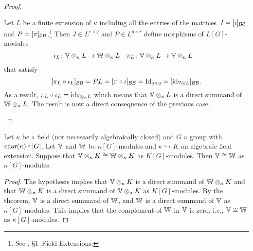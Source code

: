 \begin{proof}
\begin{description}
        Let $L$ be a finite extension of $\kappa$ including all the entries of the matrices $J=[\iota]_{\mathcal B\mathcal C}$ and $P=[\pi]_{\mathcal C\mathcal B}$.\footnote{See \citep{LC}, \S1~Field Extensions.} Then  $J\in L^{r\times q}$ and $P\in L^{q\times r}$ define morphisms of $L[G]$-modules
        \begin{align*}
            \iota_L\colon\mathbb V\otimes_\kappa L
                &\to\mathbb W\otimes_\kappa L
            &\pi_L\colon\mathbb V\otimes_\kappa L
                &\to\mathbb V\otimes_\kappa L
        \end{align*}
        that satisfy
        $$
            [\pi_L\circ\iota_L]_{\mathcal B\mathcal B}
                = PL = [\pi\circ\iota]_{\mathcal B\mathcal B}=\operatorname{Id}_{q\times q}
                =[\operatorname{id}_{\mathbb V\otimes L}]_{\mathcal B\mathcal B}.
        $$
        As a result, $\pi_L\circ\iota_L=\operatorname{id}_{\mathbb V\otimes_\kappa L}$ which means that $\mathbb V\otimes_\kappa L$ is a direct summand of $\mathbb W\otimes_\kappa L$. The result is now a direct consequence of the previous case.
    \end{description}
\end{proof}

\begin{cor}\label{cor:isomorphisms-under-field-extensions}
    Let\/ $\kappa$ be a field (not necessarily algebraically closed) and\/ $G$ a group with\/ $\operatorname{char}(\kappa)\nmid|G|$. Let\/ $\mathbb V$ and\/ $\mathbb W$ be\/ $\kappa[G]$-modules and $\kappa\hookrightarrow K$ an algebraic field extension. Suppose that\/ $\mathbb V\otimes_\kappa K\cong \mathbb W\otimes_\kappa K$ as $K[G]$-modules. Then\/ $\mathbb V\cong \mathbb W$ as\/ $\kappa[G]$-modules.
\end{cor}

\begin{proof}
    The hypothesis implies that $\mathbb V\otimes_\kappa K$ is a direct summand of $\mathbb W\otimes_\kappa K$ and that $\mathbb W\otimes_\kappa K$ is a direct summand of $\mathbb V\otimes_\kappa K$ as $K[G]$-modules. By the theorem, $\mathbb V$ is a direct summand of $\mathbb W$, and $\mathbb W$ is a direct summand of $\mathbb V$ as $\kappa[G]$-modules. This implies that the complement of $\mathbb W$ in $\mathbb V$ is zero, i.e., $\mathbb V\cong\mathbb W$ as $\kappa[G]$-modules.
\end{proof}


